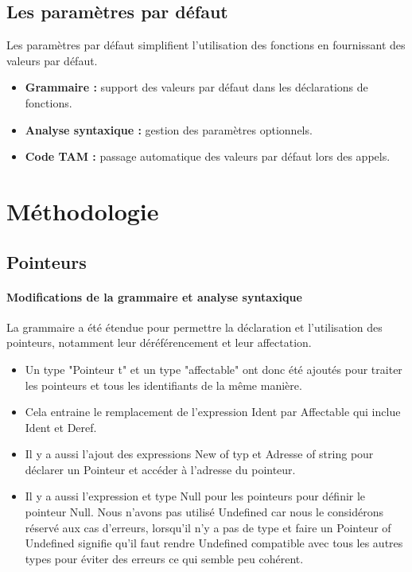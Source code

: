 \documentclass[a4paper,12pt]{article}
\begin{document}
\subsection{Les param\`etres par d\'efaut}
Les param\`etres par d\'efaut simplifient l'utilisation des fonctions en fournissant des valeurs par d\'efaut.
\begin{itemize}
    \item \textbf{Grammaire :} support des valeurs par d\'efaut dans les d\'eclarations de fonctions.
    \item \textbf{Analyse syntaxique :} gestion des param\`etres optionnels.
    \item \textbf{Code TAM :} passage automatique des valeurs par d\'efaut lors des appels.
\end{itemize}

\section{Méthodologie}

\subsection{Pointeurs}
\paragraph{Modifications de la grammaire et analyse syntaxique}
La grammaire a été étendue pour permettre la déclaration et l'utilisation des pointeurs, notamment leur déréférencement et leur affectation.
\begin{itemize}
\item Un type "Pointeur t" et un type "affectable" ont donc été ajoutés pour traiter les pointeurs et tous les identifiants de la même manière.

\item Cela entraine le remplacement de l'expression Ident par Affectable qui inclue Ident et Deref.

\item Il y a aussi l'ajout des expressions New of typ et Adresse of string pour déclarer un Pointeur et accéder à l'adresse du pointeur.

\item Il y a aussi l'expression et type Null pour les pointeurs pour définir le pointeur Null. Nous n'avons pas utilisé Undefined car nous le considérons réservé aux cas d'erreurs, lorsqu'il n'y a pas de type et faire un Pointeur of Undefined signifie qu'il faut rendre Undefined compatible avec tous les autres types pour éviter des erreurs ce qui semble peu cohérent.
\end{itemize}
\end{document}
